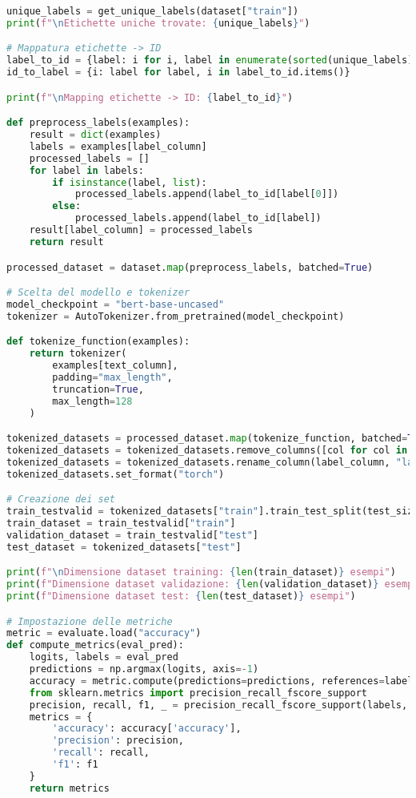 \documentclass[a4paper,12pt]{article}
\begin{document}
\begin{lstlisting}[language=Python, caption={Versione 1}]
unique_labels = get_unique_labels(dataset["train"])
print(f"\nEtichette uniche trovate: {unique_labels}")

# Mappatura etichette -> ID
label_to_id = {label: i for i, label in enumerate(sorted(unique_labels))}
id_to_label = {i: label for label, i in label_to_id.items()}

print(f"\nMapping etichette -> ID: {label_to_id}")

def preprocess_labels(examples):
    result = dict(examples)
    labels = examples[label_column]
    processed_labels = []
    for label in labels:
        if isinstance(label, list):
            processed_labels.append(label_to_id[label[0]])
        else:
            processed_labels.append(label_to_id[label])
    result[label_column] = processed_labels
    return result

processed_dataset = dataset.map(preprocess_labels, batched=True)

# Scelta del modello e tokenizer
model_checkpoint = "bert-base-uncased"
tokenizer = AutoTokenizer.from_pretrained(model_checkpoint)

def tokenize_function(examples):
    return tokenizer(
        examples[text_column],
        padding="max_length",
        truncation=True,
        max_length=128
    )

tokenized_datasets = processed_dataset.map(tokenize_function, batched=True)
tokenized_datasets = tokenized_datasets.remove_columns([col for col in processed_dataset["train"].column_names if col != label_column])
tokenized_datasets = tokenized_datasets.rename_column(label_column, "labels")
tokenized_datasets.set_format("torch")

# Creazione dei set
train_testvalid = tokenized_datasets["train"].train_test_split(test_size=0.2, seed=42)
train_dataset = train_testvalid["train"]
validation_dataset = train_testvalid["test"]
test_dataset = tokenized_datasets["test"]

print(f"\nDimensione dataset training: {len(train_dataset)} esempi")
print(f"Dimensione dataset validazione: {len(validation_dataset)} esempi")
print(f"Dimensione dataset test: {len(test_dataset)} esempi")

# Impostazione delle metriche
metric = evaluate.load("accuracy")
def compute_metrics(eval_pred):
    logits, labels = eval_pred
    predictions = np.argmax(logits, axis=-1)
    accuracy = metric.compute(predictions=predictions, references=labels)
    from sklearn.metrics import precision_recall_fscore_support
    precision, recall, f1, _ = precision_recall_fscore_support(labels, predictions, average='weighted')
    metrics = {
        'accuracy': accuracy['accuracy'],
        'precision': precision,
        'recall': recall,
        'f1': f1
    }
    return metrics


\end{lstlisting}
\end{document}
